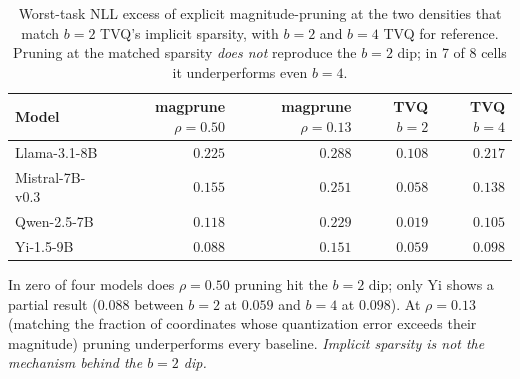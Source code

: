 \begin{table}[t]
\centering
\caption{Worst-task NLL excess of explicit magnitude-pruning at the
two densities that match $b=2$ TVQ's implicit sparsity, with
$b=2$ and $b=4$ TVQ for reference. Pruning at the matched
sparsity \emph{does not} reproduce the $b=2$ dip; in 7 of 8 cells
it underperforms even $b=4$.}
\label{tab:e7-prune-vs-tvq}
\begin{tabular}{lrrrr}
\hline
Model & magprune $\rho=0.50$ & magprune $\rho=0.13$ & TVQ $b=2$ & TVQ $b=4$ \\
\hline
Llama-3.1-8B    & $0.225$ & $0.288$ & $0.108$ & $0.217$ \\
Mistral-7B-v0.3 & $0.155$ & $0.251$ & $0.058$ & $0.138$ \\
Qwen-2.5-7B     & $0.118$ & $0.229$ & $0.019$ & $0.105$ \\
Yi-1.5-9B       & $0.088$ & $0.151$ & $0.059$ & $0.098$ \\
\hline
\end{tabular}
\end{table}

In zero of four models does $\rho = 0.50$ pruning hit the $b=2$
dip; only Yi shows a partial result ($0.088$ between $b=2$ at
$0.059$ and $b=4$ at $0.098$). At $\rho = 0.13$ (matching the
fraction of coordinates whose quantization error exceeds their
magnitude) pruning underperforms every baseline. \emph{Implicit
sparsity is not the mechanism behind the $b=2$ dip.}

